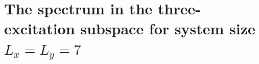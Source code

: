 \documentclass[longbibliography, aps, prx, amsmath, amssymb, amsfonts, twocolumn,superscriptaddress, footinbib]{revtex4-1}
\begin{document}


	\section{The spectrum in the three-excitation subspace for system size $L_x=L_y=7$~\label{sec:AddtionalSpectrum2}}
\end{document}
